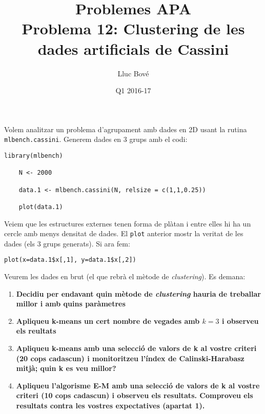 \documentclass[a4paper]{article}
\title{Problemes APA \\ Problema 12: Clustering de les dades artificials de Cassini}
\author{Lluc Bové}
\date{Q1 2016-17}
\begin{document}
\maketitle

Volem analitzar un problema d'agrupament amb dades en 2D usant la rutina \lstinline{mlbench.cassini}. Generem dades en 3 grups amb el codi:\\

\begin{lstlisting}[frame=none,numbers=none]
	library(mlbench)
	
	N <- 2000
	
	data.1 <- mlbench.cassini(N, relsize = c(1,1,0.25))
	
	plot(data.1)
\end{lstlisting}
 
 Veiem que les estructures externes tenen forma de plàtan i entre elles hi ha un cercle amb menys densitat de dades. El \lstinline|plot| anterior mostr la veritat de les dades (els $3$ grups generats). Si ara fem:
 
 \begin{lstlisting}[frame=none,numbers=none]
plot(x=data.1$x[,1], y=data.1$x[,2])
 \end{lstlisting}
 
 Veurem les dades en brut (el que rebrà el mètode de \textit{clustering}). Es demana:
 
 \begin{enumerate}
 	\item \textbf{ Decidiu per endavant quin mètode de \textit{clustering} hauria de treballar millor i amb quins paràmetres}
 	\item \textbf{Apliqueu k-means un cert nombre de vegades amb $k = 3$ i observeu els reultats}
 	\item \textbf{Apliqueu k-means amb una selecció de valors de k al vostre criteri (20 cops cadascun) i monitoritzeu l'índex de Calinski-Harabasz mitjà; quin k es veu millor?}
 	
 	\item \textbf{Apliqueu l'algorisme E-M amb una selecció de valors de k al vostre criteri (10 cops cadascun) i observeu els resultats. Comproveu els resultats contra les vostres expectatives (apartat 1).}
 \end{enumerate}
\end{document}
